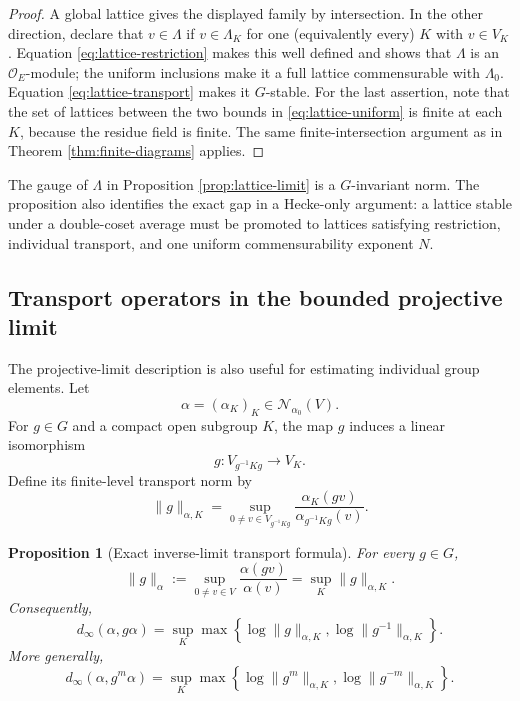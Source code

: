 \documentclass[12pt]{article}
\newtheorem{proposition}[theorem]{Proposition}
\theoremstyle{definition}
\theoremstyle{remark}
\newcommand{\Norm}{\mathscr N}
\newcommand{\dinf}{d_{\infty}}
\newcommand{\Ocoeff}{\mathcal O_E}
\begin{document}
\begin{proof}
A global lattice gives the displayed family by intersection.  In the
other direction, declare that $v\in\Lambda$ if
$v\in\Lambda_K$ for one (equivalently every) $K$ with $v\in V_K$.
Equation \eqref{eq:lattice-restriction} makes this well defined and
shows that $\Lambda$ is an $\Ocoeff$-module; the uniform inclusions
make it a full lattice commensurable with $\Lambda_0$.
Equation \eqref{eq:lattice-transport} makes it $G$-stable.  For the
last assertion, note that the set of lattices between the two bounds
in \eqref{eq:lattice-uniform} is finite at each $K$, because the
residue field is finite.  The same finite-intersection argument as in
Theorem \ref{thm:finite-diagrams} applies.
\end{proof}

The gauge of $\Lambda$ in Proposition \ref{prop:lattice-limit} is a
$G$-invariant norm.  The proposition also identifies the exact gap in
a Hecke-only argument: a lattice stable under a double-coset average
must be promoted to lattices satisfying restriction, individual
transport, and one uniform commensurability exponent $N$.


\subsection{Transport operators in the bounded projective limit}
\label{subsec:inverse-limit-transport}

The projective-limit description is also useful for estimating individual
group elements.  Let
\[
 \alpha=(\alpha_K)_K\in\Norm_{\alpha_0}(V).
\]
For \(g\in G\) and a compact open subgroup \(K\), the map \(g\) induces a
linear isomorphism
\[
 g:V_{g^{-1}Kg}\longrightarrow V_K.
\]
Define its finite-level transport norm by
\begin{equation}\label{eq:finite-level-transport-norm}
 \|g\|_{\alpha,K}
 =
 \sup_{0\neq v\in V_{g^{-1}Kg}}
 \frac{\alpha_K(gv)}
 {\alpha_{g^{-1}Kg}(v)}.
\end{equation}

\begin{proposition}[Exact inverse-limit transport formula]
\label{prop:inverse-limit-transport}
For every \(g\in G\),
\begin{equation}\label{eq:global-operator-as-sup-levels}
 \|g\|_\alpha
 :=
 \sup_{0\neq v\in V}\frac{\alpha(gv)}{\alpha(v)}
 =
 \sup_K\|g\|_{\alpha,K}.
\end{equation}
Consequently,
\begin{equation}\label{eq:dinf-inverse-limit-transport}
 \dinf(\alpha,g\alpha)
 =
 \sup_K
 \max\left\{
 \log\|g\|_{\alpha,K},
 \log\|g^{-1}\|_{\alpha,K}
 \right\}.
\end{equation}
More generally,
\begin{equation}\label{eq:dinf-inverse-limit-powers}
 \dinf(\alpha,g^m\alpha)
 =
 \sup_K
 \max\left\{
 \log\|g^m\|_{\alpha,K},
 \log\|g^{-m}\|_{\alpha,K}
 \right\}.
\end{equation}
\end{proposition}
\end{document}
